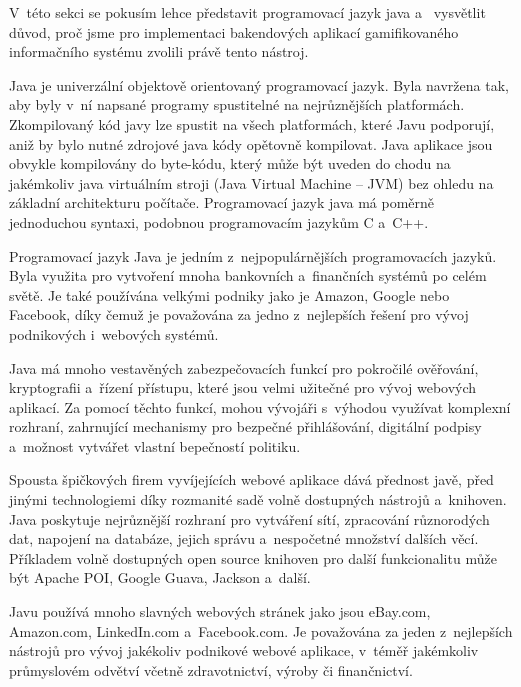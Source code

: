\documentclass[12pt]{article}
\begin{document}
{
V~této sekci se pokusím lehce představit programovací jazyk java a~
vysvětlit důvod, proč jsme pro implementaci bakendových aplikací
gamifikovaného informačního systému zvolili právě tento nástroj.

Java je univerzální objektově orientovaný programovací jazyk.
Byla navržena tak, aby byly v~ní napsané programy spustitelné na nejrůznějších platformách.
Zkompilovaný kód javy lze spustit na všech platformách, které Javu podporují,
aniž by bylo nutné zdrojové java kódy opětovně kompilovat.
Java aplikace jsou obvykle kompilovány do byte-kódu, 
který může být uveden do chodu na jakémkoliv java virtuálním stroji
(Java Virtual Machine -- JVM) bez ohledu na základní architekturu počítače.
Programovací jazyk java má poměrně jednoduchou syntaxi, 
podobnou programovacím jazykům C a~C++.
\cite{oracleJava}


Programovací jazyk Java je jedním z~nejpopulárnějších programovacích jazyků.
Byla využita pro vytvoření mnoha bankovních a~finančních systémů po celém světě.
Je také používána velkými podniky jako je Amazon, Google nebo Facebook,
díky čemuž je považována za jedno z~nejlepších řešení pro vývoj podnikových i~webových systémů.

Java má mnoho vestavěných zabezpečovacích funkcí pro pokročilé ověřování,
kryptografii a~řízení přístupu, které jsou velmi užitečné pro vývoj webových aplikací.
Za pomocí těchto funkcí, mohou vývojáři s~výhodou využívat komplexní
rozhraní, zahrnující mechanismy pro bezpečné přihlášování, digitální podpisy a~možnost vytvářet vlastní bepečností politiku.

Spousta špičkových firem vyvíjejících webové aplikace dává přednost javě, 
před jinými technologiemi díky rozmanité sadě volně dostupných nástrojů a~knihoven.
Java poskytuje nejrůznější rozhraní pro vytváření sítí, zpracování různorodých dat,
napojení na databáze, jejich správu a~nespočetné množství dalších věcí.
Příkladem volně dostupných open source knihoven pro další funkcionalitu může být
Apache POI, Google Guava, Jackson a~další.

Javu používá mnoho slavných webových stránek jako jsou
eBay.com, Amazon.com, LinkedIn.com a~Facebook.com. 
Je považována za jeden z~nejlepších nástrojů
pro vývoj jakékoliv podnikové webové aplikace, v~téměř
jakémkoliv průmyslovém odvětví včetně zdravotnictví, výroby či finančnictví.

}
\end{document}
